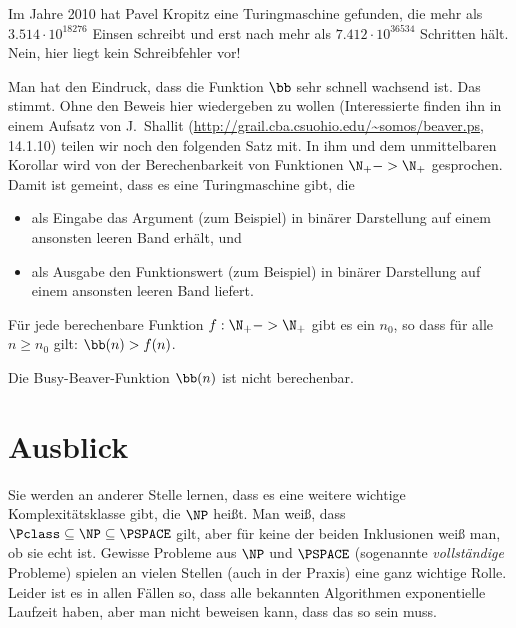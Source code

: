Im Jahre 2010 hat Pavel Kropitz eine Turingmaschine gefunden, die mehr
als $3.514\cdot 10^{18276}$ Einsen schreibt und erst nach mehr als
$7.412\cdot 10^{36534}$ Schritten hält. Nein, hier liegt kein
Schreibfehler vor!

Man hat den Eindruck, dass die Funktion $\bb$ sehr schnell wachsend
ist. Das stimmt. Ohne den Beweis hier wiedergeben zu wollen
(Interessierte finden ihn \zB in einem Aufsatz von J.~Shallit
(\url{http://grail.cba.csuohio.edu/~somos/beaver.ps}, 14.1.10) teilen
wir noch den folgenden Satz mit.  In ihm und dem unmittelbaren
Korollar wird von der Berechenbarkeit von Funktionen $\N_+ -> \N_+$
gesprochen. Damit ist gemeint, dass es eine Turingmaschine gibt, die
\begin{itemize}
\item als Eingabe das Argument (zum Beispiel) in binärer Darstellung
  auf einem ansonsten leeren Band erhält, und
\item als Ausgabe den Funktionswert (zum Beispiel) in binärer
  Darstellung auf einem ansonsten leeren Band liefert.
\end{itemize}
%
\begin{theorem}
  Für jede berechenbare Funktion $f:\N_+ -> \N_+$ gibt es ein $n_0$, so
  dass für alle $n\geq n_0$ gilt: $\bb(n) > f(n)$.
\end{theorem}
%
\begin{korollar}
  Die Busy-Beaver-Funktion $\bb(n)$ ist nicht berechenbar.
\end{korollar}
%

\section{Ausblick}
\label{sec:tm-ausblick}

Sie werden an anderer Stelle lernen, dass es eine weitere wichtige
Komplexitätsklasse gibt, die $\NP$ heißt. Man weiß, dass $\Pclass\subseteq
\NP\subseteq\PSPACE$ gilt, aber für keine der beiden Inklusionen weiß
man, ob sie echt ist. Gewisse Probleme aus $\NP$ und $\PSPACE$
(sogenannte \emph{vollständige} Probleme) spielen an vielen Stellen
(auch in der Praxis) eine ganz wichtige Rolle. Leider ist es in allen
Fällen so, dass alle bekannten Algorithmen exponentielle Laufzeit
haben, aber man nicht beweisen kann, dass das so sein muss.

